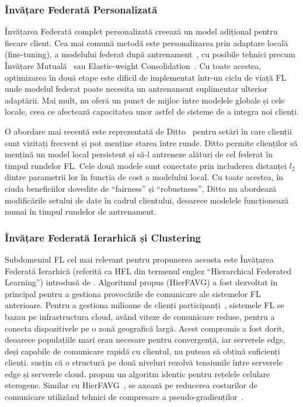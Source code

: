 \subsubsection{Învățare Federată Personalizată}

Învățarea Federată complet personalizată creează un model adițional pentru fiecare client. Cea mai comună metodă este personalizarea prin adaptare locală (fine-tuning), a modelului federat după antrenament~\citep{SalvagingFL}, cu posibile tehnici precum Învățare Mutuală~\citep{DeepMutualLearning} sau Elastic-weight Consolidation~\citep{kirkpatrick2017overcoming}. Cu toate acestea, optimizarea în două etape este dificil de implementat într-un ciclu de viață FL unde modelul federat poate necesita un antrenament suplimentar ulterior adaptării. Mai mult, nu oferă un punct de mijloc între modelele globale și cele locale, ceea ce afectează capacitatea unor astfel de sisteme de a integra noi clienți.

O abordare mai recentă este reprezentată de Ditto~\citep{Ditto} pentru setări în care clienții sunt vizitați frecvent și pot menține starea între runde. Ditto permite clienților să mențină un model local persistent și să-l antreneze alături de cel federat în timpul rundelor FL. Cele două modele sunt conectate prin includerea distanței $l_2$ dintre parametrii lor în funcția de cost a modelului local. Cu toate acestea, în ciuda beneficiilor dovedite de ``fairness'' și ``robustness'', Ditto nu abordează modificările setului de date în cadrul clientului, deoarece modelele funcționează numai în timpul rundelor de antrenament.

\subsubsection{Învățare Federată Ierarhică și Clustering}

Subdomeniul FL cel mai relevant pentru propunerea aceasta este Învățarea Federată Ierarhică (referită ca HFL din termenul englez ``Hierarchical Federated Learning'') introdusă de \citet{Client-Edge-CloudHierFL}. Algoritmul propus (HierFAVG) a fost dezvoltat în principal pentru a gestiona provocările de comunicare ale sistemelor FL anterioare. Pentru a gestiona milioane de clienți participanți~\citep{GoogleKeyboard, ScaleSystemDesign}, sistemele FL se bazau pe infrastructura cloud, având viteze de comunicare reduse, pentru a conecta dispozitivele pe o zonă geografică largă. Acest compromis a fost dorit, deoarece populațiile mari erau necesare pentru convergență, iar serverele edge, deși capabile de comunicare rapidă cu clientul, nu puteau să obțină suficienți clienți. \citet{Client-Edge-CloudHierFL} susțin că o structură pe două niveluri rezolvă tensiunile între serverele edge și serverele cloud. \citet{Hier_Het_Cellular} propun un algoritm identic pentru rețelele celulare eterogene. Similar cu HierFAVG~\citep{Client-Edge-CloudHierFL}, \citet{Hier_Het_Cellular} se axează pe reducerea costurilor de comunicare utilizând tehnici de compresare a pseudo-gradienților~\citep{DeepGradientCompressin}.

